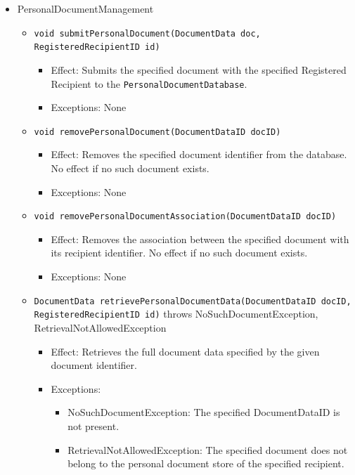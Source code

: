 \documentclass[a4paper,10pt]{article}
\begin{document}
\begin{itemize}
	\item PersonalDocumentManagement
	\begin{itemize}
		\item \texttt{void submitPersonalDocument(DocumentData doc, RegisteredRecipientID id)}
		\begin{itemize}
			\item Effect: Submits the specified document with the specified Registered Recipient to the \texttt{PersonalDocumentDatabase}.
			\item Exceptions: None
		\end{itemize}

		\item \texttt{void removePersonalDocument(DocumentDataID docID)}
		\begin{itemize}
			\item Effect: Removes the specified document identifier from the database. No effect if no such document exists.
			\item Exceptions: None
		\end{itemize}

		\item \texttt{void removePersonalDocumentAssociation(DocumentDataID docID)}
		\begin{itemize}
			\item Effect: Removes the association between the specified document with its recipient identifier. No effect if no such document exists.
			\item Exceptions: None
		\end{itemize}

		\item \texttt{DocumentData retrievePersonalDocumentData(DocumentDataID docID, RegisteredRecipientID id)} throws NoSuchDocumentException, RetrievalNotAllowedException
		\begin{itemize}
			\item Effect: Retrieves the full document data specified by the given document identifier.
			\item Exceptions:
			\begin{itemize}
				\item NoSuchDocumentException: The specified DocumentDataID is not present.
				\item RetrievalNotAllowedException: The specified document does not belong to the personal document store of the specified recipient.
			\end{itemize}
		\end{itemize}


\end{itemize}
\end{itemize}
\end{document}
